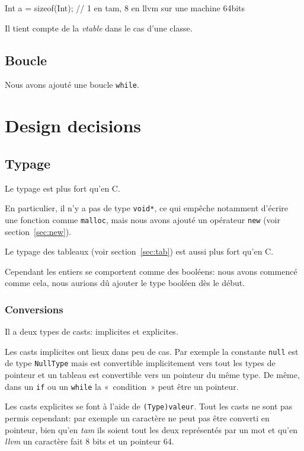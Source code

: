\documentclass{scrartcl}
\newcommand{\llvm}{\textit{llvm}}
\newcommand{\tam} {\textit{tam}}
\begin{document}
    \begin{moccode}
Int a = sizeof(Int); // 1 en tam, 8 en llvm sur une machine 64bits
    \end{moccode}

    Il tient compte de la \textit{vtable} dans le cas d'une classe.

  \subsection{Boucle}
    Nous avons ajouté une boucle \verb+while+.

\section{Design decisions}
  \subsection{Typage}
    Le typage est plus fort qu'en C.

    En particulier, il n'y a pas de type \verb+void*+, ce qui empêche notamment
    d'écrire une fonction comme \verb+malloc+, mais nous avons ajouté un
    opérateur \verb+new+ (voir section~\ref{sec:new}).

    Le typage des tableaux (voir section~\ref{sec:tab}) est aussi plus fort qu'en C.

    Cependant les entiers se comportent comme des booléens: nous avons commencé
    comme cela, nous aurions dû ajouter le type booléen dès le début.

    \subsubsection{Conversions}
      Il a deux types de casts: implicites et explicites.

      Les casts implicites ont lieux dans peu de cas. Par exemple la constante
      \verb+null+ est de type \verb+NullType+ mais est convertible
      implicitement vers tout les types de pointeur et un tableau est
      convertible vers un pointeur du même type. De même, dans un \verb+if+ ou
      un \verb+while+ la «~condition~» peut être un pointeur.

      Les casts explicites se font à l'aide de \verb+(Type)valeur+. Tout les
      casts ne sont pas permis cependant: par exemple un caractère ne peut pas
      être converti en pointeur, bien qu'en \tam{} ils soient tout les deux
      représentés par un mot et qu'en \llvm{} un caractère fait 8 bits et un
      pointeur 64.
\end{document}
